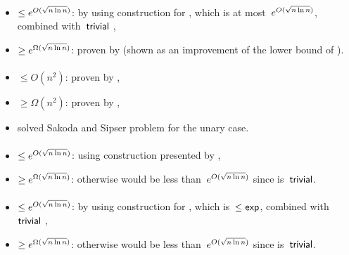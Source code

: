 \paragraph{\TDFA{}\tto\ONFA}\label{cost:2DFAto1NFAu}
\begin{itemize}
	\item $\le e^{O(\sqrt{n\ln n})}$: by using construction for \hyperref[cost:2DFAto1DFAu]{\TDFA{}\tto\ODFA}, which is at most~$e^{O(\sqrt{n\ln n})}$, combined with~$\mathsf{trivial}$ \ODFA{}\tto\ONFA,
	\item $\ge e^{\Omega(\sqrt{n\ln n})}$: proven by  (shown as an improvement of the lower bound of \hyperref[cost:2DFAto1DFAu]{\TDFA{}\tto\ODFA}).
\end{itemize}
\paragraph{\ONFA{}\tto\TDFA}\label{cost:1NFAto2DFAu}
\begin{itemize}
	\item $\le O(n^2)$: proven by ,
	\item $\ge \Omega(n^2)$: proven by ,
	\item solved Sakoda and Sipser problem for the unary case.
\end{itemize}
\paragraph{\TNFA{}\tto\ODFA}\label{cost:2NFAto1DFAu}
\begin{itemize}
	\item $\le e^{O(\sqrt{n\ln n})}$: using construction presented by ,
	\item $\ge e^{\Omega(\sqrt{n\ln n})}$: otherwise \hyperref[cost:2DFAto1DFAu]{\TDFA{}\tto\ODFA} would be less than~$e^{O(\sqrt{n\ln n})}$ since \TDFA{}\tto\TNFA is~$\mathsf{trivial}$.
\end{itemize}
\paragraph{\TNFA{}\tto\ONFA}
\begin{itemize}
	\item $\le e^{O(\sqrt{n\ln n})}$: by using construction for \hyperref[cost:2NFAto1DFAu]{\TNFA{}\tto\ODFA}, which is~$\le\mathsf{exp}$, combined with~$\mathsf{trivial}$ \ODFA{}\tto\ONFA,
	\item $\ge e^{\Omega(\sqrt{n\ln n})}$: otherwise \hyperref[cost:2DFAto1NFAu]{\TDFA{}\tto\ONFA} would be less than~$e^{O(\sqrt{n\ln n})}$ since \TDFA{}\tto\TNFA is~$\mathsf{trivial}$.
\end{itemize}
